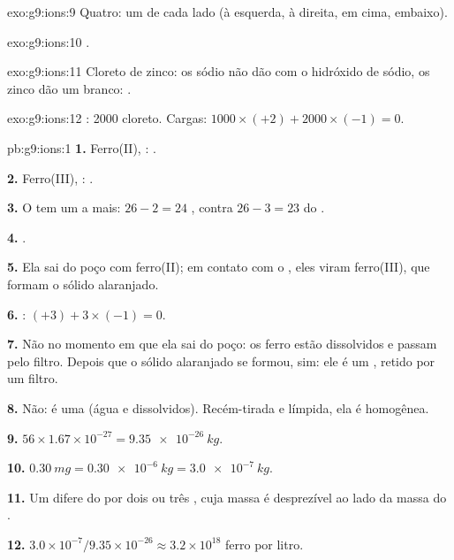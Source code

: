 \begin{solution}{exo:g9:ions:9}
Quatro: um de cada lado (à esquerda, à direita, em cima, embaixo).
\end{solution}

\begin{solution}{exo:g9:ions:10}
.
\end{solution}

\begin{solution}{exo:g9:ions:11}
Cloreto de zinco: os  sódio não dão  com o hidróxido de
sódio, os  zinco dão um branco:
.
\end{solution}

\begin{solution}{exo:g9:ions:12}
: 2000  cloreto. Cargas: $1000 \times (+2) + 2000 \times
(-1) = 0$.
\end{solution}

\begin{solution}{pb:g9:ions:1}
\textbf{1.} Ferro(II), : .

\textbf{2.} Ferro(III), : .

\textbf{3.} O  tem um a mais: $26 - 2 = 24$ , contra
$26 - 3 = 23$ do .

\textbf{4.} .

\textbf{5.} Ela sai do poço com  ferro(II); em contato com o ,
eles viram  ferro(III), que formam o sólido alaranjado.

\textbf{6.} : $(+3) + 3 \times (-1) = 0$.

\textbf{7.} Não no momento em que ela sai do poço: os  ferro estão
dissolvidos e passam pelo filtro. Depois que o sólido alaranjado se
formou, sim: ele é um , retido por um filtro.

\textbf{8.} Não: é uma  (água e  dissolvidos). Recém-tirada e
límpida, ela é homogênea.

\textbf{9.} $56 \times 1.67 \times 10^{-27} = \qty{9.35e-26}{kg}$.

\textbf{10.} $\qty{0.30}{mg} = \qty{0.30e-6}{kg} = \qty{3.0e-7}{kg}$.

\textbf{11.} Um  difere do  por dois ou três , cuja
massa é desprezível ao lado da massa do .

\textbf{12.} $3.0 \times 10^{-7} / 9.35 \times 10^{-26} \approx 3.2
\times 10^{18}$  ferro por litro.
\end{solution}
